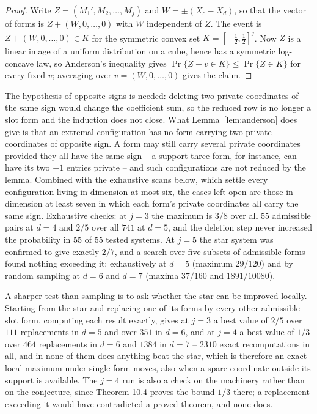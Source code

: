 \begin{proof}
Write $Z=(M_1',M_2,\dots,M_j)$ and $W=\pm(X_c-X_d)$, so that the vector
of forms is $Z+(W,0,\dots,0)$ with $W$ independent of $Z$.  The event is
$Z+(W,0,\dots,0)\in K$ for the symmetric convex set
$K=[-\tfrac12,\tfrac12]^j$.  Now $Z$ is a linear image of a uniform
distribution on a cube, hence has a symmetric log-concave law, so
Anderson's inequality gives $\Pr\{Z+v\in K\}\le\Pr\{Z\in K\}$ for every
fixed $v$; averaging over $v=(W,0,\dots,0)$ gives the claim.
\end{proof}

The hypothesis of opposite signs is needed: deleting two private
coordinates of the same sign would change the coefficient sum, so the
reduced row is no longer a slot form and the induction does not close.
What Lemma~\ref{lem:anderson} does give is that an extremal
configuration has no form carrying two private coordinates of opposite
sign.  A form may still carry several private coordinates provided they
all have the same sign -- a support-three form, for instance, can have
its two $+1$ entries private -- and such configurations are not reduced
by the lemma.  Combined with the exhaustive scans below,
which settle every configuration living in dimension at most six, the
cases left open are those in dimension at least seven in which each
form's private coordinates all carry the same sign.  Exhaustive checks: at $j=3$ the maximum is $3/8$ over all $55$
admissible pairs at $d=4$ and $2/5$ over all $741$ at $d=5$, and the
deletion step never increased the probability in $55$ of $55$ tested
systems.  At $j=5$ the star system was confirmed to give exactly $2/7$,
and a search over five-subsets of admissible forms found nothing
exceeding it: exhaustively at $d=5$ (maximum $29/120$) and by random
sampling at $d=6$ and $d=7$ (maxima $37/160$ and $1891/10080$).

A sharper test than sampling is to ask whether the star can be improved
locally.  Starting from the star and replacing one of its forms by every
other admissible slot form, computing each result exactly, gives at
$j=3$ a best value of $2/5$ over $111$ replacements in $d=5$ and over
$351$ in $d=6$, and at $j=4$ a best value of $1/3$ over $464$
replacements in $d=6$ and $1384$ in $d=7$ -- $2310$ exact
recomputations in all, and in none of them does anything beat the star,
which is therefore an exact local maximum under single-form moves, also
when a spare coordinate outside its support is available.  The $j=4$ run
is also a check on the machinery rather than on the conjecture, since
Theorem 10.4 proves the bound $1/3$ there; a replacement exceeding it
would have contradicted a proved theorem, and none does.

